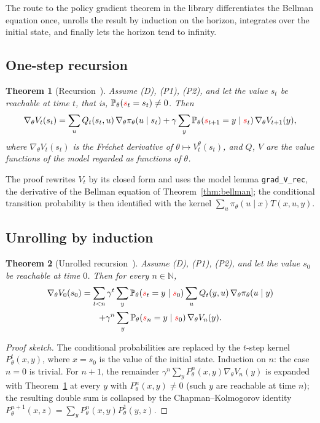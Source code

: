 \documentclass[11pt,a4paper]{article}
\newtheorem{theorem}{Theorem}[section]
\newcommand{\N}{\mathbb{N}}
\newcommand{\Prb}{\mathbb{P}}
\newcommand{\rv}[1]{{\color{red}#1}}       %
\newcommand{\sv}{\rv{s}}
\newcommand{\grad}{\nabla_{\theta}}
\begin{document}
The route to the policy gradient theorem in the library differentiates the Bellman equation once, unrolls the result by induction on the horizon, integrates over the initial state, and finally lets the horizon tend to infinity.

\subsection{One-step recursion}

\begin{theorem}[Recursion~\cite{lemma_recursion}]
\label{thm:rec}
Assume (D), (P1), (P2), and let the value $s_t$ be reachable at time $t$, that is, $\Prb_\theta(\sv_t=s_t)\neq0$.
Then
\[
\grad V_t(s_t)=\sum_{u}Q_t(s_t,u)\,\grad\pi_\theta(u\mid s_t)
+\gamma\sum_{y}\Prb_\theta(\sv_{t+1}=y\mid\sv_t)\,\grad V_{t+1}(y),
\]
where $\grad V_t(s_t)$ is the Fr\'echet derivative of $\theta\mapsto V^\theta_t(s_t)$, and $Q$, $V$ are the value functions of the model regarded as functions of $\theta$.
\end{theorem}
The proof rewrites $V_t$ by its closed form and uses the model lemma \texttt{grad\_V\_rec}, the derivative of the Bellman equation of Theorem~\ref{thm:bellman}; the conditional transition probability is then identified with the kernel $\sum_u\pi_\theta(u\mid x)T(x,u,y)$.

\subsection{Unrolling by induction}

\begin{theorem}[Unrolled recursion~\cite{lemma_induct}]
\label{thm:induct}
Assume (D), (P1), (P2), and let the value $s_0$ be reachable at time $0$.
Then for every $n\in\N$,
\begin{multline*}
\grad V_0(s_0)=\sum_{t<n}\gamma^t\sum_y\Prb_\theta(\sv_t=y\mid\sv_0)\sum_u Q_t(y,u)\,\grad\pi_\theta(u\mid y)\\
+\gamma^n\sum_y\Prb_\theta(\sv_n=y\mid\sv_0)\,\grad V_n(y).
\end{multline*}
\end{theorem}
\begin{proof}[Proof sketch]
The conditional probabilities are replaced by the $t$-step kernel $P^t_\theta(x,y)$, where $x=s_0$ is the value of the initial state.
Induction on $n$: the case $n=0$ is trivial.
For $n+1$, the remainder $\gamma^n\sum_yP^n_\theta(x,y)\grad V_n(y)$ is expanded with Theorem~\ref{thm:rec} at every $y$ with $P^n_\theta(x,y)\ne0$ (such $y$ are reachable at time $n$); the resulting double sum is collapsed by the Chapman--Kolmogorov identity $P^{n+1}_\theta(x,z)=\sum_yP^n_\theta(x,y)P^1_\theta(y,z)$.
\end{proof}
\end{document}
